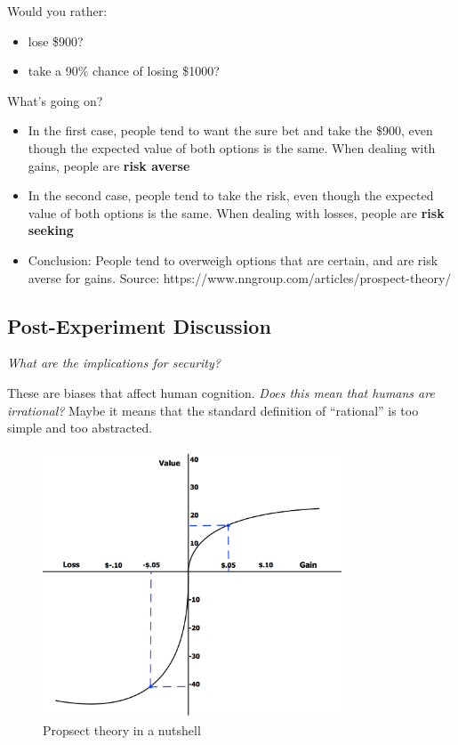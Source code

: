 \documentclass[11pt]{article}
\begin{document}
Would you rather:
\begin{itemize}
    \item lose \$900?
    \item take a 90\% chance of losing \$1000?
\end{itemize}

What's going on?
\begin{itemize}
    \item In the first case, people tend to want the sure bet and take the \$900, even though the expected value of both options is the same. When dealing with gains, people are {\bf risk averse}
    \item In the second case, people tend to take the risk, even though the expected value of both options is the same. When dealing with losses, people are {\bf risk seeking}
    \item Conclusion: People tend to overweigh options that are certain, and are risk averse for gains. Source: https://www.nngroup.com/articles/prospect-theory/
\end{itemize}


\subsection{Post-Experiment Discussion}

{\it What are the implications for security?}

These are biases that affect human cognition.
{\it Does this mean that humans are irrational?} Maybe it means that the standard definition of ``rational'' is too simple and too abstracted.


\begin{figure}[h]
    \centering
    \includegraphics*[width=3.5in]{prospect_theory.png}
    \caption{Propsect theory in a nutshell}
    \label{fig:ptheory}
\end{figure}
\end{document}
